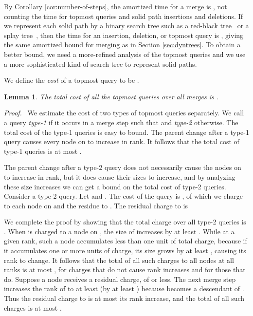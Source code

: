 \documentclass[twoside,leqno,twocolumn]{article}
\newtheorem{lemma}{Lemma}
\newcommand{\proof}{\noindent \emph{Proof.}\ }
\newcommand{\proofend}{\\}
\begin{document}
By Corollary \ref{cor:number-of-steps}, the amortized time for a merge is , not counting the time for topmost queries and solid path insertions and deletions.  If we represent each solid path by a binary search tree such as a red-black tree~\cite{GS78} or a splay tree~\cite{ST85}, then the time for an insertion, deletion, or topmost query is , giving the same  amortized bound for merging as in Section \ref{sec:dyntrees}.  To obtain a better bound, we need a more-refined analysis of the topmost queries and we use a more-sophisticated kind of search tree to represent solid paths.

We define the \emph{cost} of a topmost query  to be .

\begin{lemma}
\label{lemma:topmost}
The total cost of all the topmost queries over all merges is .
\end{lemma}
\proof
We estimate the cost of two types of topmost queries separately.  We call a query \emph{type-1} if it occurs in a merge step such that  and \emph{type-2} otherwise.  The total cost of the type-1 queries is easy to bound.  The parent change after a type-1 query causes every node on  to increase in rank.  It follows that the total cost of type-1 queries is at most .

The parent change after a type-2 query does not necessarily cause the nodes on  to increase in rank, but it does cause their sizes to increase, and by analyzing these size increases we can get a bound on the total cost of type-2 queries.  Consider a type-2 query.  Let  and .  The cost of the query is , of which we charge  to each node on  and the residue to .  The residual charge to  is

We complete the proof by showing that the total charge over all type-2 queries is .  When  is charged to a node  on , the size of  increases by at least .  While at a given rank, such a node  accumulates less than one unit of total charge, because if it accumulates one or more units of charge, its size grows by at least , causing its rank to change.  It follows that the total of all such charges to all nodes at all ranks is at most ,  for charges that do not cause rank increases and  for those that do.  Suppose a node  receives a residual charge, of  or less.  The next merge step increases the rank of  to at least  (by at least ) because  becomes a descendant of .  Thus the residual charge to  is at most its rank increase, and the total of all such charges is at most .  \proofend
\end{document}
